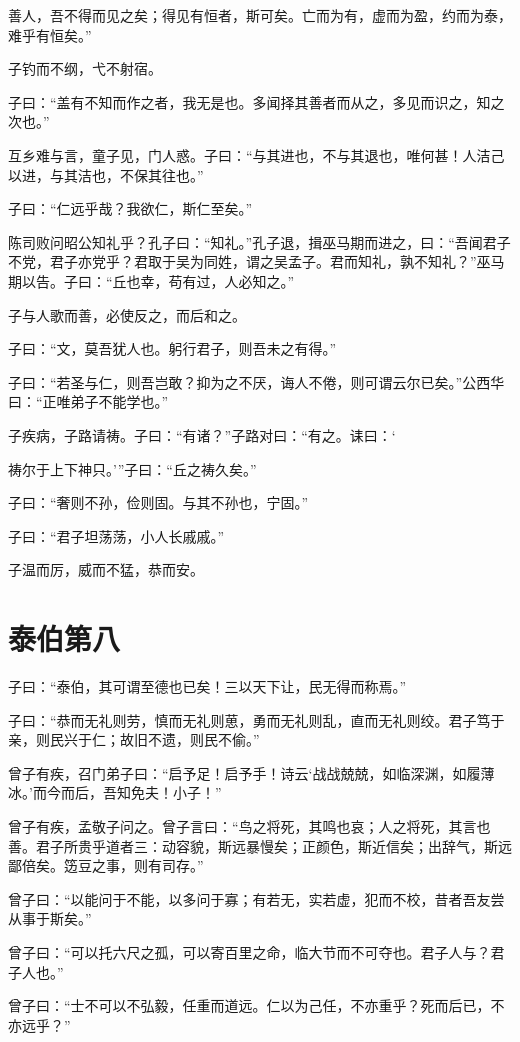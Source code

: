 \documentclass[twoside,openany]{book}
\begin{document}
善人，吾不得而见之矣；得见有恒者，斯可矣。亡而为有，虚而为盈，约而为泰，难乎有恒矣。”

子钓而不纲，弋不射宿。

子曰：“盖有不知而作之者，我无是也。多闻择其善者而从之，多见而识之，知之次也。”

互乡难与言，童子见，门人惑。子曰：“与其进也，不与其退也，唯何甚！人洁己以进，与其洁也，不保其往也。”

子曰：“仁远乎哉？我欲仁，斯仁至矣。”

陈司败问昭公知礼乎？孔子曰：“知礼。”孔子退，揖巫马期而进之，曰：“吾闻君子不党，君子亦党乎？君取于吴为同姓，谓之吴孟子。君而知礼，孰不知礼？”巫马期以告。子曰：“丘也幸，苟有过，人必知之。”

子与人歌而善，必使反之，而后和之。

子曰：“文，莫吾犹人也。躬行君子，则吾未之有得。”

子曰：“若圣与仁，则吾岂敢？抑为之不厌，诲人不倦，则可谓云尔已矣。”公西华曰：“正唯弟子不能学也。”

子疾病，子路请祷。子曰：“有诸？”子路对曰：“有之。诔曰：‘

祷尔于上下神只。’”子曰：“丘之祷久矣。”

子曰：“奢则不孙，俭则固。与其不孙也，宁固。”

子曰：“君子坦荡荡，小人长戚戚。”

子温而厉，威而不猛，恭而安。 

\chapter{泰伯第八}\label{ch8}

子曰：“泰伯，其可谓至德也已矣！三以天下让，民无得而称焉。”

子曰：“恭而无礼则劳，慎而无礼则葸，勇而无礼则乱，直而无礼则绞。君子笃于亲，则民兴于仁；故旧不遗，则民不偷。”

曾子有疾，召门弟子曰：“启予足！启予手！诗云‘战战兢兢，如临深渊，如履薄冰。’而今而后，吾知免夫！小子！”

曾子有疾，孟敬子问之。曾子言曰：“鸟之将死，其鸣也哀；人之将死，其言也善。君子所贵乎道者三：动容貌，斯远暴慢矣；正颜色，斯近信矣；出辞气，斯远鄙倍矣。笾豆之事，则有司存。”

曾子曰：“以能问于不能，以多问于寡；有若无，实若虚，犯而不校，昔者吾友尝从事于斯矣。”

曾子曰：“可以托六尺之孤，可以寄百里之命，临大节而不可夺也。君子人与？君子人也。”

曾子曰：“士不可以不弘毅，任重而道远。仁以为己任，不亦重乎？死而后已，不亦远乎？”
\end{document}
